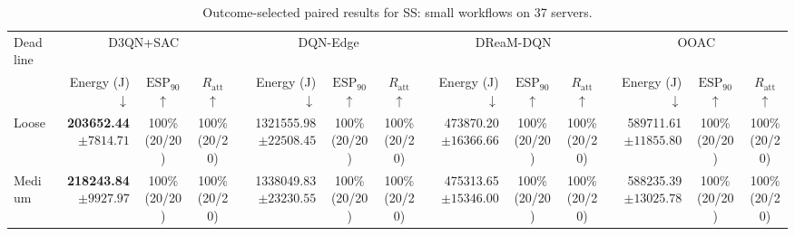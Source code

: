 \begin{table}[!t]
\centering
\caption{Outcome-selected paired results for SS: small workflows on 37 servers.}
\label{tab:conditional_case_ss}
\begingroup
\footnotesize
\setlength{\tabcolsep}{2.2pt}
\renewcommand{\arraystretch}{1.08}
\begin{tabular}{@{}l*{4}{rcc}@{}}
\toprule
Deadline & \multicolumn{3}{c}{D3QN+SAC} & \multicolumn{3}{c}{DQN-Edge} & \multicolumn{3}{c}{DReaM-DQN} & \multicolumn{3}{c}{OOAC} \\
\cmidrule(lr){2-4}\cmidrule(lr){5-7}\cmidrule(lr){8-10}\cmidrule(lr){11-13}
 & Energy (J) $\downarrow$ & $\mathrm{ESP}_{90}$ $\uparrow$ & $R_{\mathrm{att}}$ $\uparrow$ & Energy (J) $\downarrow$ & $\mathrm{ESP}_{90}$ $\uparrow$ & $R_{\mathrm{att}}$ $\uparrow$ & Energy (J) $\downarrow$ & $\mathrm{ESP}_{90}$ $\uparrow$ & $R_{\mathrm{att}}$ $\uparrow$ & Energy (J) $\downarrow$ & $\mathrm{ESP}_{90}$ $\uparrow$ & $R_{\mathrm{att}}$ $\uparrow$ \\
\midrule
Loose & \shortstack[r]{\textbf{203652.44}\\$\pm 7814.71$} & \shortstack[c]{100\%\\(20/20)} & \shortstack[c]{100\%\\(20/20)} & \shortstack[r]{1321555.98\\$\pm 22508.45$} & \shortstack[c]{100\%\\(20/20)} & \shortstack[c]{100\%\\(20/20)} & \shortstack[r]{473870.20\\$\pm 16366.66$} & \shortstack[c]{100\%\\(20/20)} & \shortstack[c]{100\%\\(20/20)} & \shortstack[r]{589711.61\\$\pm 11855.80$} & \shortstack[c]{100\%\\(20/20)} & \shortstack[c]{100\%\\(20/20)} \\
Medium & \shortstack[r]{\textbf{218243.84}\\$\pm 9927.97$} & \shortstack[c]{100\%\\(20/20)} & \shortstack[c]{100\%\\(20/20)} & \shortstack[r]{1338049.83\\$\pm 23230.55$} & \shortstack[c]{100\%\\(20/20)} & \shortstack[c]{100\%\\(20/20)} & \shortstack[r]{475313.65\\$\pm 15346.00$} & \shortstack[c]{100\%\\(20/20)} & \shortstack[c]{100\%\\(20/20)} & \shortstack[r]{588235.39\\$\pm 13025.78$} & \shortstack[c]{100\%\\(20/20)} & \shortstack[c]{100\%\\(20/20)} \\

\end{tabular}
\end{table}
